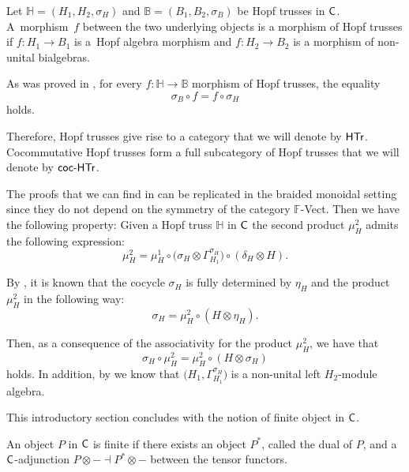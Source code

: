 \documentclass[pdftex]{sigma}
\numberwithin{equation}{section}
\begin{document}
\begin{Definition}
Let $\mathbb{H}=(H_{1},H_{2},\sigma_{H})$ and $\mathbb{B}=(B_{1},B_{2},\sigma_{B})$ be Hopf trusses in $\sf{C}$. A~morphism~$f$ between the two underlying objects is a morphism of Hopf trusses if $f\colon H_{1}\rightarrow B_{1}$ is a~Hopf algebra morphism and $f\colon H_{2}\rightarrow B_{2}$ is a morphism of non-unital bialgebras.

As was proved in \cite[Proposition 6.8]{BRZ1}, for every $f\colon \mathbb{H}\rightarrow \mathbb{B}$ morphism of Hopf trusses, the equality
\begin{equation}\label{Cond mor truss}
\sigma_{B}\circ f=f\circ \sigma_{H}
\end{equation}
holds.
\end{Definition}
Therefore, Hopf trusses give rise to a category that we will denote by $\sf{HTr}$. Cocommutative Hopf trusses form a full subcategory of Hopf trusses that we will denote by $\sf{coc}\textnormal{-}{\sf HTr}$.

The proofs that we can find in \cite[Section 6]{BRZ1} can be replicated in the braided monoidal setting since they do not depend on the symmetry of the category ${\mathbb F}$-{\sf Vect}. Then we have the following property: Given a Hopf truss $\mathbb{H}$ in $\sf{C}$ the second product $\mu_{H}^{2}$ admits the following expression:
\begin{equation}\label{mu2Htruss}
\mu_{H}^{2}=\mu_{H}^{1}\circ\bigl(\sigma_{H}\otimes\Gamma_{H_{1}}^{\sigma_{H}}\bigr)\circ(\delta_{H}\otimes H).
\end{equation}

By \cite[Lemma 6.2]{BRZ1}, it is known that the cocycle $\sigma_{H}$ is fully determined by $\eta_{H}$ and the product~$\mu_{H}^{2}$ in the following way:
\begin{equation*}%
\sigma_{H}=\mu_{H}^{2}\circ(H\otimes\eta_{H}).
\end{equation*}

Then, as a consequence of the associativity for the product $\mu_{H}^{2}$, we have that
\begin{equation}\label{cocycle truss 2}
\sigma_{H}\circ\mu_{H}^{2}=\mu_{H}^{2}\circ(H\otimes\sigma_{H})
\end{equation}
holds. In addition, by \cite[Theorem 6.5]{BRZ1} we know that $\bigl(H_{1},\Gamma_{H_{1}}^{\sigma_{H}}\bigr)$ is a non-unital left $H_{2}$-module algebra.

This introductory section concludes with the notion of finite object in $\sf{C}$.
\begin{Definition}%
An object $P$ in $\sf{C}$ is finite if there exists an object $P^{\ast}$, called the dual of $P$, and a $\sf{C}$-adjunction $P\otimes -\dashv P^{\ast}\otimes -$ between the tensor functors.
\end{Definition}
\end{document}
